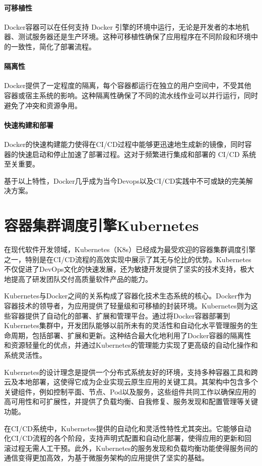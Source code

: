 \paragraph{可移植性}Docker容器可以在任何支持 Docker 引擎的环境中运行，无论是开发者的本地机器、测试服务器还是生产环境。这种可移植性确保了应用程序在不同阶段和环境中的一致性，简化了部署流程。

\paragraph{隔离性}Docker提供了一定程度的隔离，每个容器都运行在独立的用户空间中，不受其他容器或宿主系统的影响。这种隔离性确保了不同的流水线作业可以并行运行，同时避免了冲突和资源争用。

\paragraph{快速构建和部署}Docker的快速构建能力使得在CI/CD过程中能够更迅速地生成新的镜像，同时容器的快速启动和停止加速了部署过程。这对于频繁进行集成和部署的 CI/CD 系统至关重要。

基于以上特性，Docker几乎成为当今Devops以及CI/CD实践中不可或缺的完美解决方案\cite{第二章Devops}。

\section{容器集群调度引擎Kubernetes}
在现代软件开发领域，Kubernetes（K8s）已经成为最受欢迎的容器集群调度引擎之一，特别是在CI/CD流程的高效实现中展示了其无与伦比的优势。Kubernetes不仅促进了DevOps文化的快速发展，还为敏捷开发提供了坚实的技术支持，极大地提高了研发团队交付高质量软件产品的能力。

Kubernetes与Docker之间的关系构成了容器化技术生态系统的核心。Docker作为容器技术的领导者，为应用提供了轻量级和可移植的封装环境。Kubernetes则为这些容器提供了自动化的部署、扩展和管理平台。通过将Docker容器部署到Kubernetes集群中，开发团队能够以前所未有的灵活性和自动化水平管理服务的生命周期，包括部署、扩展和更新。这种结合最大化地利用了Docker容器的隔离性和资源轻量化的优点，并通过Kubernetes的管理能力实现了更高级的自动化操作和系统灵活性。

Kubernetes的设计理念是提供一个分布式系统友好的环境，支持多种容器工具和跨云及本地部署，这使得它成为企业实现云原生应用的关键工具。其架构中包含多个关键组件，例如控制平面、节点、Pod以及服务，这些组件共同工作以确保应用的高可用性和可扩展性，并提供了负载均衡、自我修复、服务发现和配置管理等关键功能。

在CI/CD系统中，Kubernetes提供的自动化和灵活性特性尤其突出。它能够自动化CI/CD流程的各个阶段，支持声明式配置和自动化部署，使得应用的更新和回滚过程无需人工干预。此外，Kubernetes的服务发现和负载均衡功能使得服务间的通信变得更加高效，为基于微服务架构的应用提供了坚实的基础。

